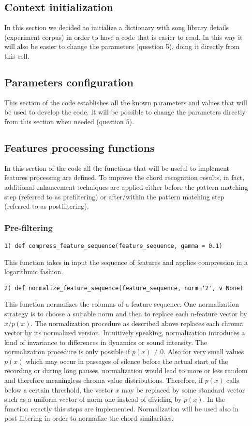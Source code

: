 \documentclass[
	12pt, %
]{fphw}
\begin{document}
\subsection{Context initialization}
In this section we decided to initialize a dictionary with song library details (experiment corpus) in order to have a code that is easier to read. In this way it will also be easier to change the parameters (question 5), doing it directly from this cell.

\subsection{Parameters configuration}
This section of the code establishes all the known parameters and values that will be used to develop the code. It will be possible to change the parameters directly from this section when needed (question 5).

\subsection{Features processing functions}
In this section of the code all the functions that will be useful to implement features processing are defined. To improve the chord recognition results, in fact, additional enhancement techniques are applied either before the pattern matching step (referred to as prefiltering) or after/within the pattern matching step (referred to as postfiltering).

\subsubsection{Pre-filtering}

\begin{lstlisting}
1) def compress_feature_sequence(feature_sequence, gamma = 0.1)
\end{lstlisting}
This function takes in input the sequence of features and applies compression in a logarithmic fashion.
\begin{lstlisting}
2) def normalize_feature_sequence(feature_sequence, norm='2', v=None)
\end{lstlisting}
This function normalizes the columns of a feature sequence. One normalization strategy is to choose a suitable norm  and then to replace each n-feature vector  by $ x/p(x) $.
The normalization procedure as described above replaces each chroma vector by its normalized version. Intuitively speaking, normalization introduces a kind of invariance to differences in dynamics or sound intensity.
The normalization procedure is only possible if $p(x) \neq 0
$. Also for very small values $p(x)$ which may occur in passages of silence before the actual start of the recording or during long pauses, normalization would lead to more or less random and therefore meaningless chroma value distributions. Therefore, if $p(x)$ calls below a certain threshold, the vector $x$ may be replaced by some standard vector such as a uniform vector of norm one instead of dividing by $p(x)$. In the function exactly this steps are implemented.
Normalization will be used also in post filtering in order to normalize the chord similarities.
\end{document}
